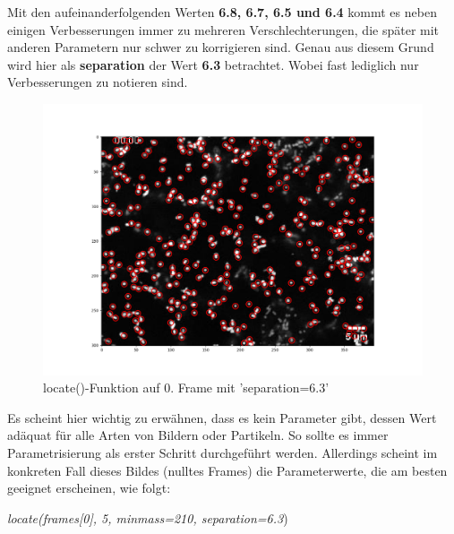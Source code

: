 \begin{enumerate}
Mit den aufeinanderfolgenden Werten \textbf{6.8, 6.7, 6.5 und 6.4} kommt es neben einigen Verbesserungen immer zu mehreren Verschlechterungen, die später mit anderen Parametern nur schwer zu korrigieren sind. 
Genau aus diesem Grund wird hier als  \textbf{separation} der Wert \textbf{6.3} betrachtet.
Wobei fast lediglich nur Verbesserungen zu notieren sind. 
\begin{figure}[H]
    \centering
    \includegraphics[scale=0.35]{Grafiken/trackpyBilder/locate_with_separation_(6,3).png}
    \caption{locate()-Funktion auf 0. Frame mit 'separation=6.3'}
    \label{fig:kap3_sep=6.3}
\end{figure}


\end{enumerate}


Es scheint hier wichtig zu erwähnen, dass es kein Parameter gibt, dessen Wert adäquat für alle Arten von Bildern oder Partikeln. So sollte es immer Parametrisierung als erster Schritt durchgeführt werden.
Allerdings scheint im konkreten Fall dieses Bildes (nulltes Frames) die Parameterwerte, die am besten geeignet erscheinen, wie folgt: \\
\begin{center}
{\large \textit{locate(frames[0], 5, minmass=210, separation=6.3})}
\end{center}

